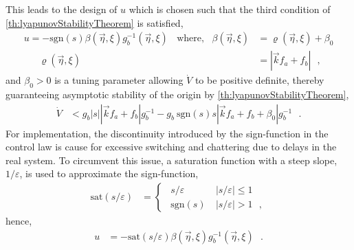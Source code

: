 This leads to the design of $u$ which is chosen such that the third condition of \autoref{th:lyapunovStabilityTheorem} is satisfied,
\begin{align}
u = -\text{sgn}(s)\beta (\vec{\eta},\xi) g_b^{-1}(\vec{\eta},\xi) \ \ \ \ \mathrm{where}, \ \ \ \beta(\vec{\eta},\xi)  &= \varrho(\vec{\eta},\xi) + \beta_0 \\
\ \ \ \ \ \ \  \varrho(\vec{\eta},\xi) &= \left|\vec{k}f_a  +  f_b \right| \ \ \ ,
\label{eq:ssControlBeta0}
\end{align}
and  $\beta_0 > 0$ is a tuning parameter allowing $\dot{V}$ to be positive definite, thereby guaranteeing asymptotic stability of the origin by \autoref{th:lyapunovStabilityTheorem},
\begin{align}
\dot{V} &< g_b |s| \left|\vec{k}f_a +  f_b \right|  g_b^{-1} - g_b\  \mathrm{sgn}(s) s \left|\vec{k}f_a  +  f_b + \beta_0 \right| g_b^{-1} \ \ \ .
\label{eq:lyapunov2}
\end{align}
For implementation, the discontinuity introduced by the sign-function in the control law is cause for excessive switching and chattering due to delays in the real system. To circumvent this issue, a saturation function with a steep slope, $1/\varepsilon$, is used to approximate the sign-function,
\begin{align}
\text{sat}\left( s/\varepsilon \right) &=
\begin{cases}
\ \ s/\varepsilon              &  \ | s/\varepsilon | \leq 1 \\
\ \ \text{sgn}\left( s \right) &  \ | s/\varepsilon |  >   1 \ \ \ ,
\end{cases}
\label{eq:satuationFunction2}
\end{align}
hence,
\begin{align}
u &= -\text{sat}(s/\varepsilon)\beta (\vec{\eta},\xi)  g_b^{-1}(\vec{\eta},\xi)  \ \ \ .
\label{eq:ssControlSat}
\end{align}

